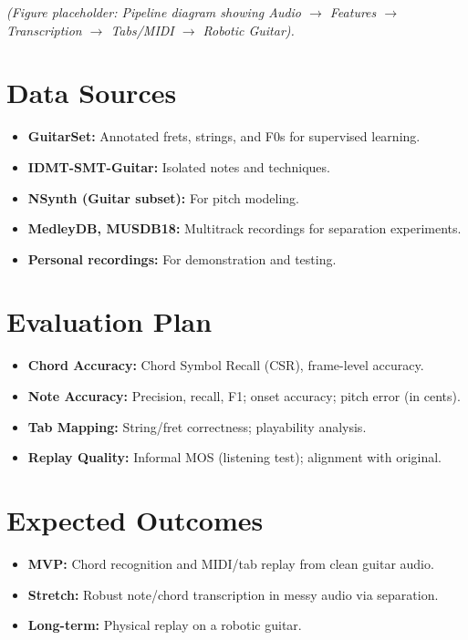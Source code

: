 \documentclass[11pt]{article}
\begin{document}
\noindent \textit{(Figure placeholder: Pipeline diagram showing Audio $\rightarrow$ Features $\rightarrow$ Transcription $\rightarrow$ Tabs/MIDI $\rightarrow$ Robotic Guitar).}

\section*{Data Sources}
\begin{itemize}[leftmargin=*,itemsep=2pt]
  \item \textbf{GuitarSet:} Annotated frets, strings, and F0s for supervised learning.
  \item \textbf{IDMT-SMT-Guitar:} Isolated notes and techniques.
  \item \textbf{NSynth (Guitar subset):} For pitch modeling.
  \item \textbf{MedleyDB, MUSDB18:} Multitrack recordings for separation experiments.
  \item \textbf{Personal recordings:} For demonstration and testing.
\end{itemize}

\section*{Evaluation Plan}
\begin{itemize}[leftmargin=*,itemsep=2pt]
  \item \textbf{Chord Accuracy:} Chord Symbol Recall (CSR), frame-level accuracy.
  \item \textbf{Note Accuracy:} Precision, recall, F1; onset accuracy; pitch error (in cents).
  \item \textbf{Tab Mapping:} String/fret correctness; playability analysis.
  \item \textbf{Replay Quality:} Informal MOS (listening test); alignment with original.
\end{itemize}

\section*{Expected Outcomes}
\begin{itemize}[leftmargin=*,itemsep=2pt]
  \item \textbf{MVP:} Chord recognition and MIDI/tab replay from clean guitar audio.
  \item \textbf{Stretch:} Robust note/chord transcription in messy audio via separation.
  \item \textbf{Long-term:} Physical replay on a robotic guitar.
\end{itemize}
\end{document}
